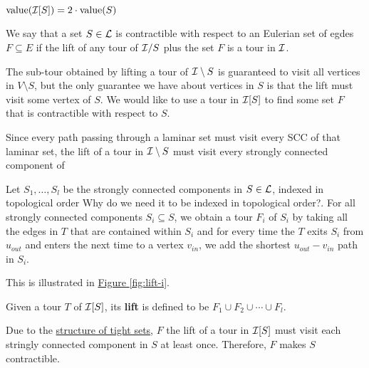 \documentclass[./main.tex]{subfiles}
\begin{document}
	\begin{fact}
		$\textup{value}(\mathcal{I}[S]) = 2\cdot\textup{value}(S)$
	\end{fact}

	\begin{definition}
		We say that a set $S \in \mathcal{L}$ is contractible with respect to an Eulerian set of egdes $F \subseteq E$ if the lift of any tour of $\mathcal{I}/S$ plus the set $F$ is a tour in $\mathcal{I}$.\\
	\end{definition}

	The sub-tour obtained by lifting a tour of $\mathcal{I}\setminus S$ is guaranteed to visit all vertices in $V\setminus S$, but the only guarantee we have about vertices in $S$ is that the lift must visit some vertex of $S$. We would like to use a tour in $\mathcal{I}[S]$ to find some set $F$ that is contractible with respect to $S$.

	Since every path passing through a laminar set must visit every SCC of that laminar set, the lift of a tour in $\mathcal{I}\setminus S$ must visit every strongly connected component of

	Let $S_1, \dots, S_l$ be the strongly connected components in $S \in \mathcal{L}$, indexed in topological order {\color{red} Why do we need it to be indexed in topological order?}.
	For all strongly connected components $S_i \subseteq S$, we obtain a tour $F_i$ of $S_i$ by taking all the edges in $T$ that are contained within $S_i$ and for every time the $T$ exits $S_i$ from $u_{out}$ and enters the next time to a vertex $v_{in}$, we add the shortest $u_{out} - v_{in}$ path in $S_i$.

	This is illustrated in \hyperref[fig:lift-i]{Figure \ref{fig:lift-i}}.
	\vspace{2mm}
	
	\begin{definition}\label{def:3:indu-lift}
		Given a tour $T$ of $\mathcal{I}[S]$, its \textbf{lift} is defined to be $F_1\cup F_2\cup\cdots\cup F_l$.
	\end{definition}




	Due to the \hyperref[fig:tightPath]{structure of tight sets}, $F$ the lift of a tour in $\mathcal{I}[S]$ must visit each stringly connected component in $S$ at least once. Therefore, $F$ makes $S$ contractible.\\
	
\end{document}
